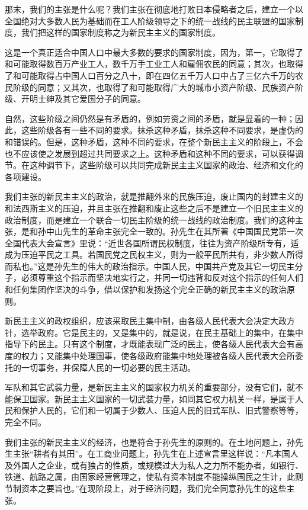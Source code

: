那末，我们的主张是什么呢？我们主张在彻底地打败日本侵略者之后，建立一个以全国绝对大多数人民为基础而在工人阶级领导之下的统一战线的民主联盟的国家制度，我们把这样的国家制度称之为新民主主义的国家制度。

这是一个真正适合中国人口中最大多数的要求的国家制度，因为，第一，它取得了和可能取得数百万产业工人，数千万手工业工人和雇佣农民的同意；其次，也取得了和可能取得占中国人口百分之八十，即在四亿五千万人口中占了三亿六千万的农民阶级的同意；又其次，也取得了和可能取得广大的城市小资产阶级、民族资产阶级、开明士绅及其它爱国分子的同意。

自然，这些阶级之间仍然是有矛盾的，例如劳资之间的矛盾，就是显着的一种；因此，这些阶级各有一些不同的要求。抹杀这种矛盾，抹杀这种不同要求，是虚伪的和错误的。但是，这种矛盾，这种不同的要求，在整个新民主主义的阶段上，不会也不应该使之发展到超过共同要求之上。这种矛盾和这种不同的要求，可以获得调节。在这种调节下，这些阶级可以共同完成新民主主义国家的政治、经济和文化的各项建设。

我们主张的新民主主义的政治，就是推翻外来的民族压迫，废止国内的封建主义的和法西斯主义的压迫，并且主张在推翻和废止这些之后不是建立一个旧民主主义的政治制度，而是建立一个联合一切民主阶级的统一战线的政治制度。我们的这种主张，是和孙中山先生的革命主张完全一致的。孙先生在其所著《中国国民党第一次全国代表大会宣言》里说：“近世各国所谓民权制度，往往为资产阶级所专有，适成为压迫平民之工具。若国民党之民权主义，则为一般平民所共有，非少数人所得而私也。”这是孙先生的伟大的政治指示。中国人民，中国共产党及其它一切民主分子，必须尊重这个指示而坚决地实行之，并同一切违背和反对这个指示的任何人们和任何集团作坚决的斗争，借以保护和发扬这个完全正确的新民主主义的政治原则。

新民主主义的政权组织，应该采取民主集中制，由各级人民代表大会决定大政方针，选举政府。它是民主的，又是集中的，就是说，在民主基础上的集中，在集中指导下的民主。只有这个制度，才既能表现广泛的民主，使各级人民代表大会有高度的权力；又能集中处理国事，使各级政府能集中地处理被各级人民代表大会所委托的一切事务，并保障人民的一切必要的民主活动。

军队和其它武装力量，是新民主主义的国家权力机关的重要部分，没有它们，就不能保卫国家。新民主主义国家的一切武装力量，如同其它权力机关一样，是属于人民和保护人民的，它们和一切属于少数人、压迫人民的旧式军队、旧式警察等等，完全不同。

我们主张的新民主主义的经济，也是符合于孙先生的原则的。在土地问题上，孙先生主张“耕者有其田”。在工商业问题上，孙先生在上述宣言里这样说：“凡本国人及外国人之企业，或有独占的性质，或规模过大为私人之力所不能办者，如银行、铁道、航路之属，由国家经营管理之，使私有资本制度不能操纵国民之生计，此则节制资本之要旨也。”在现阶段上，对于经济问题，我们完全同意孙先生的这些主张。

